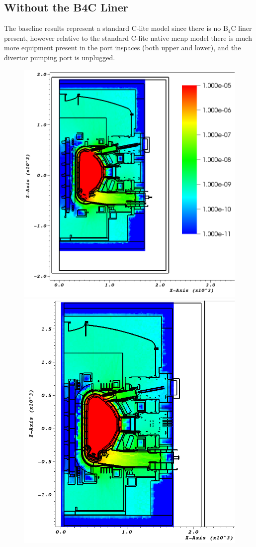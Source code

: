 \documentclass[12pt]{article}
\begin{document}
\subsection{Without the B4C Liner}
The baseline results represent a standard C-lite model since there is no B$_4$C
liner present, however relative to the standard C-lite native \gls{mcnp} model there
is much more equipment present in the port inspaces (both upper and lower), and
the divertor pumping port is unplugged. 
\begin{figure}[ht!]
  \centering
  \includegraphics[scale=0.35]{../plots/neutron/nob4c/y_0.png}
  \includegraphics[scale=0.35]{../plots/neutron/nob4c/y_-17.png}

\end{figure}
\end{document}
